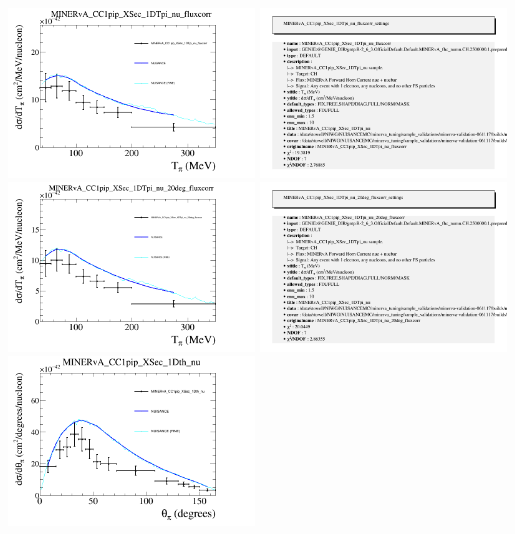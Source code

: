 \documentclass{article}
\begin{document}
\centering
\includegraphics[width=0.49\textwidth]{figures/nuisance_MINERvA_CC1pip_XSec_1DTpi_nu_fluxcorr_comp.png}
\includegraphics[width=0.49\textwidth]{figures/nuisance_MINERvA_CC1pip_XSec_1DTpi_nu_fluxcorr_info.png}
\centering
\includegraphics[width=0.49\textwidth]{figures/nuisance_MINERvA_CC1pip_XSec_1DTpi_nu_20deg_fluxcorr_comp.png}
\includegraphics[width=0.49\textwidth]{figures/nuisance_MINERvA_CC1pip_XSec_1DTpi_nu_20deg_fluxcorr_info.png}
\centering
\includegraphics[width=0.49\textwidth]{figures/nuisance_MINERvA_CC1pip_XSec_1Dth_nu_comp.png}
\end{document}
